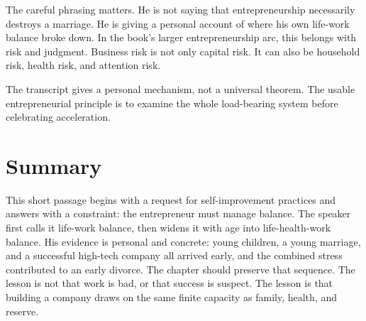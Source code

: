 The careful phrasing matters. He is not saying that entrepreneurship necessarily destroys a marriage. He is giving a personal account of where his own life-work balance broke down. In the book's larger entrepreneurship arc, this belongs with risk and judgment. Business risk is not only capital risk. It can also be household risk, health risk, and attention risk.

\begin{remark}
The transcript gives a personal mechanism, not a universal theorem. The usable entrepreneurial principle is to examine the whole load-bearing system before celebrating acceleration.
\end{remark}

\section{Summary}

This short passage begins with a request for self-improvement practices and answers with a constraint: the entrepreneur must manage balance. The speaker first calls it life-work balance, then widens it with age into life-health-work balance. His evidence is personal and concrete: young children, a young marriage, and a successful high-tech company all arrived early, and the combined stress contributed to an early divorce. The chapter should preserve that sequence. The lesson is not that work is bad, or that success is suspect. The lesson is that building a company draws on the same finite capacity as family, health, and reserve.